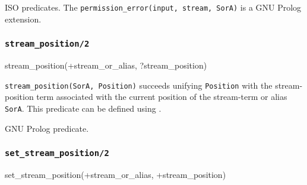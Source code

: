 \Portability

ISO predicates. The \texttt{permission\_error(input, stream, SorA)} is a
GNU Prolog extension.

\subsubsection{\texttt{stream\_position/2}}
\label{stream-position/2}

\begin{TemplatesOneCol}
stream\_position(+stream\_or\_alias, ?stream\_position)

\end{TemplatesOneCol}

\Description

\texttt{stream\_position(SorA, Position)} succeeds unifying
\texttt{Position} with the stream-position term associated with the current
position of the stream-term or alias \texttt{SorA}. This predicate can be
defined using  .

\begin{PlErrors}





\end{PlErrors}

\Portability

GNU Prolog predicate.

\subsubsection{\texttt{set\_stream\_position/2}}
\label{set-stream-position/2}

\begin{TemplatesOneCol}
set\_stream\_position(+stream\_or\_alias, +stream\_position)

\end{TemplatesOneCol}

